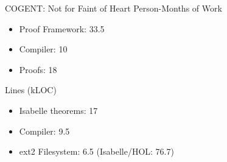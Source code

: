 \documentclass[aspectratio=169]{beamer}
\begin{document}
\begin{frame}{COGENT: Not for Faint of Heart}
Person-Months of Work
    \begin{itemize}
        \item Proof Framework: 33.5
        \item Compiler: 10
        \item Proofs: 18 
    \end{itemize}
Lines (kLOC)
    \begin{itemize}
        \item Isabelle theorems: 17
        \item Compiler: 9.5 
        \item ext2 Filesystem: 6.5 (Isabelle/HOL: 76.7) 
    \end{itemize}
\end{frame}
\end{document}
